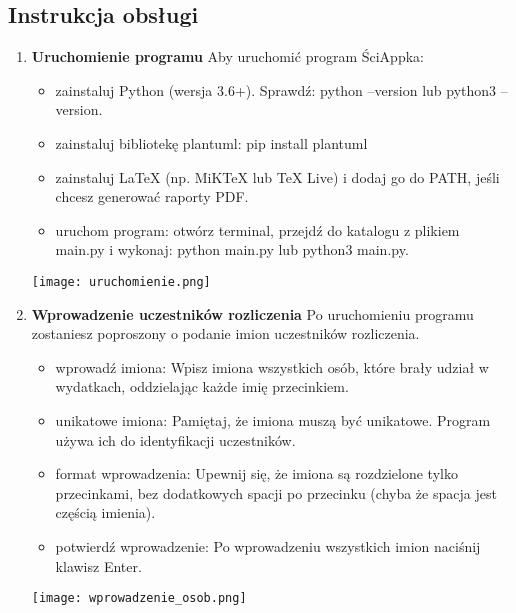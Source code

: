 \documentclass{article}
\begin{document}
\subsection{Instrukcja obsługi}
\begin{enumerate}
\item \textbf{Uruchomienie programu}
Aby uruchomić program ŚciAppka:
\begin{itemize}
\item zainstaluj Python (wersja 3.6+). Sprawdź: python --version lub python3 --version.
\item zainstaluj bibliotekę plantuml: pip install plantuml
\item zainstaluj LaTeX (np. MiKTeX lub TeX Live) i dodaj go do PATH, jeśli chcesz generować raporty PDF.
\item uruchom program: otwórz terminal, przejdź do katalogu z plikiem main.py i wykonaj: python main.py lub python3 main.py.
\end{itemize}
\begin{center}
\texttt{[image: uruchomienie.png]}
\end{center}

\item \textbf{Wprowadzenie uczestników rozliczenia}
Po uruchomieniu programu zostaniesz poproszony o podanie imion uczestników rozliczenia.
\begin{itemize}
\item wprowadź imiona: Wpisz imiona wszystkich osób, które brały udział w wydatkach, oddzielając każde imię przecinkiem.
\item unikatowe imiona: Pamiętaj, że imiona muszą być unikatowe. Program używa ich do identyfikacji uczestników.
\item format wprowadzenia: Upewnij się, że imiona są rozdzielone tylko przecinkami, bez dodatkowych spacji po przecinku (chyba że spacja jest częścią imienia).
\item potwierdź wprowadzenie: Po wprowadzeniu wszystkich imion naciśnij klawisz Enter.
\end{itemize}
\begin{center}
	\texttt{[image: wprowadzenie\_osob.png]}
\end{center}


\end{enumerate}
\end{document}

